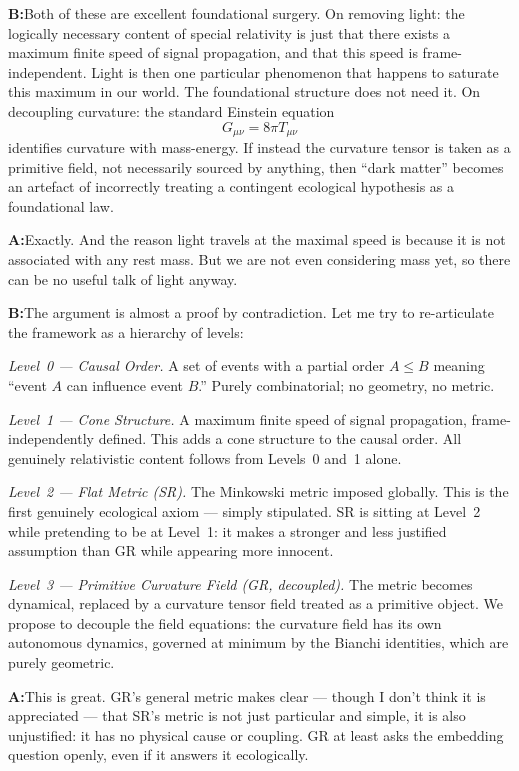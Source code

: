 \documentclass[11pt]{article}
\newcommand{\A}{\medskip\noindent\textbf{A:}\quad}
\newcommand{\B}{\medskip\noindent\textbf{B:}\quad}
\begin{document}
\B Both of these are excellent foundational surgery. On removing
light: the logically necessary content of special relativity is just
that there exists a maximum finite speed of signal propagation, and
that this speed is frame-independent. Light is then one particular
phenomenon that happens to saturate this maximum in our world. The
foundational structure does not need it. On decoupling curvature:
the standard Einstein equation
\[
G_{\mu\nu} = 8\pi T_{\mu\nu}
\]
identifies curvature with mass-energy. If instead the curvature tensor
is taken as a primitive field, not necessarily sourced by anything,
then ``dark matter'' becomes an artefact of incorrectly treating a
contingent ecological hypothesis as a foundational law.

\A Exactly. And the reason light travels at the maximal speed is
because it is not associated with any rest mass. But we are not even
considering mass yet, so there can be no useful talk of light anyway.

\B The argument is almost a proof by contradiction. Let me try to
re-articulate the framework as a hierarchy of levels:

\medskip
\textit{Level~0 --- Causal Order.} A set of events with a partial
order $A \leq B$ meaning ``event $A$ can influence event $B$.''
Purely combinatorial; no geometry, no metric.

\textit{Level~1 --- Cone Structure.} A maximum finite speed of signal
propagation, frame-independently defined. This adds a cone structure
to the causal order. All genuinely relativistic content follows from
Levels~0 and~1 alone.

\textit{Level~2 --- Flat Metric (SR).} The Minkowski metric imposed
globally. This is the first genuinely ecological axiom --- simply
stipulated. SR is sitting at Level~2 while pretending to be at
Level~1: it makes a stronger and less justified assumption than GR
while appearing more innocent.

\textit{Level~3 --- Primitive Curvature Field (GR, decoupled).} The
metric becomes dynamical, replaced by a curvature tensor field treated
as a primitive object. We propose to decouple the field equations: the
curvature field has its own autonomous dynamics, governed at minimum
by the Bianchi identities, which are purely geometric.

\A This is great. GR's general metric makes clear --- though I don't
think it is appreciated --- that SR's metric is not just particular
and simple, it is also unjustified: it has no physical cause or
coupling. GR at least asks the embedding question openly, even if it
answers it ecologically.
\end{document}
